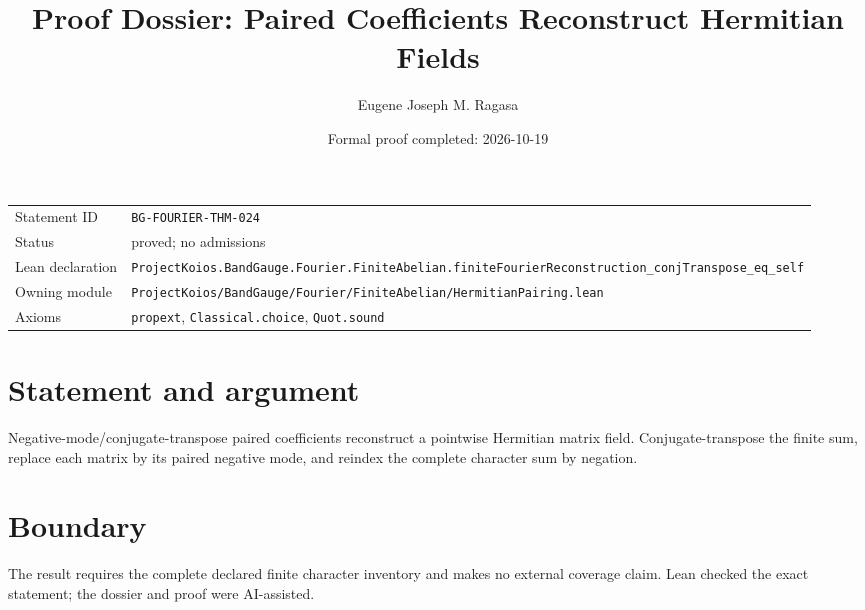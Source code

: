 \documentclass[11pt]{article}
\title{Proof Dossier: Paired Coefficients Reconstruct Hermitian Fields}
\author{Eugene Joseph M. Ragasa}
\date{Formal proof completed: 2026-10-19}
\begin{document}
\maketitle
\noindent\begin{tabularx}{\textwidth}{@{}lX@{}}\toprule
Statement ID & \texttt{BG-FOURIER-THM-024} \\
Status & proved; no admissions \\
Lean declaration & \texttt{ProjectKoios.BandGauge.Fourier.FiniteAbelian.}\newline\texttt{finiteFourierReconstruction\_conjTranspose\_eq\_self} \\
Owning module & \texttt{ProjectKoios/BandGauge/Fourier/FiniteAbelian/HermitianPairing.lean} \\
Axioms & \texttt{propext}, \texttt{Classical.choice}, \texttt{Quot.sound} \\
\bottomrule\end{tabularx}
\section{Statement and argument}
Negative-mode/conjugate-transpose paired coefficients reconstruct a pointwise Hermitian matrix field. Conjugate-transpose the finite sum, replace each matrix by its paired negative mode, and reindex the complete character sum by negation.
\section{Boundary}
The result requires the complete declared finite character inventory and makes no external coverage claim. Lean checked the exact statement; the dossier and proof were AI-assisted.
\end{document}
